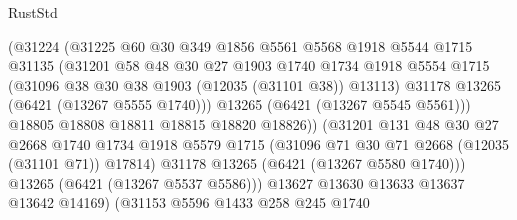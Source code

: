 \begin{lexlean}{RustStd}
\begin{coremodule}
                              (@31224
                                (@31225
                                  @60
                                  @30
                                  @349
                                  @1856
                                  @5561
                                  @5568
                                  @1918
                                  @5544
                                  @1715
                                  @31135
                                  (@31201
                                    @58
                                    @48
                                    @30
                                    @27
                                    @1903
                                    @1740
                                    @1734
                                    @1918
                                    @5554
                                    @1715
                                    (@31096 @38 @30 @38 @1903 (@12035 (@31101 @38)) @13113)
                                    @31178
                                    @13265
                                    (@6421 (@13267 @5555 @1740)))
                                  @13265
                                  (@6421 (@13267 @5545 @5561)))
                                @18805
                                @18808
                                @18811
                                @18815
                                @18820
                                @18826))
                            (@31201
                              @131
                              @48
                              @30
                              @27
                              @2668
                              @1740
                              @1734
                              @1918
                              @5579
                              @1715
                              (@31096 @71 @30 @71 @2668 (@12035 (@31101 @71)) @17814)
                              @31178
                              @13265
                              (@6421 (@13267 @5580 @1740)))
                            @13265
                            (@6421 (@13267 @5537 @5586)))
                          @13627
                          @13630
                          @13633
                          @13637
                          @13642
                          @14169)
                        (@31153
                          @5596
                          @1433
                          @258
                          @245
                          @1740

\end{coremodule}
\end{lexlean}

